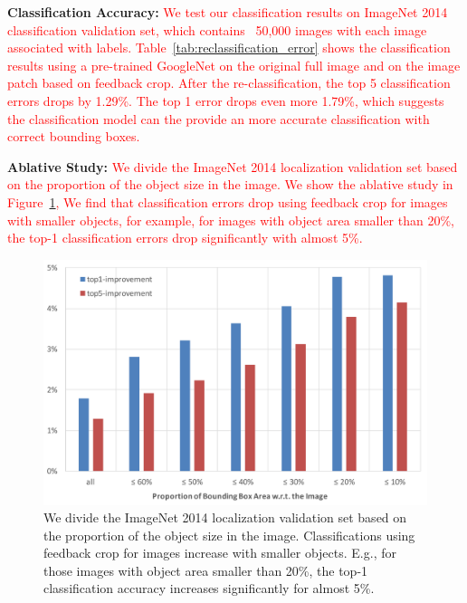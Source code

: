 \textbf{Classification Accuracy:} \textcolor{red}{We test our classification results on ImageNet 2014 classification validation set, which contains ~50,000 images with each image associated with labels. Table~\ref{tab:reclassification_error} shows the classification results using a pre-trained GoogleNet on the original full image and on the image patch based on feedback crop. After the re-classification, the top 5 classification errors drops by 1.29\%. The top 1 error drops even more 1.79\%, which suggests the classification model can the provide an more accurate classification with correct bounding boxes.}


\textbf{Ablative Study:} \textcolor{red}{We divide the ImageNet 2014 localization validation set based on the proportion of the object size in the image. We show the ablative study in Figure~\ref{fig:reclassification_delta}, We find that classification errors drop using feedback crop for images with smaller objects, for example, for images with object area smaller than 20\%, the top-1 classification errors drop significantly with almost 5\%.}

\setlength{\tabcolsep}{2pt}
\begin{figure}[htb]
\begin{center}
\includegraphics[width=0.85\columnwidth]{figs/re-classification/delta}
\caption{\color{red} We divide the ImageNet 2014 localization validation set based on the proportion of the object size in the image. Classifications using feedback crop for images increase with smaller objects. E.g., for those images with object area smaller than 20\%, the top-1 classification accuracy increases significantly for almost 5\%.}
\label{fig:reclassification_delta}
\end{center}
\end{figure}
